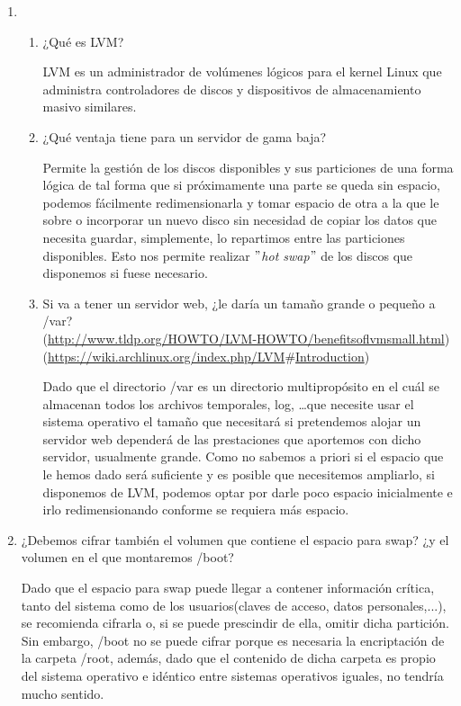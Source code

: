 \documentclass[paper=a4, fontsize=11pt]{scrartcl} %
\numberwithin{equation}{section} %
\numberwithin{figure}{section} %
\numberwithin{table}{section} %
\begin{document}
\begin{enumerate}
		
		\item \begin{enumerate}
			\item ¿Qué es LVM?
			
			LVM es un administrador de volúmenes lógicos para el kernel Linux que administra
			controladores de discos y dispositivos de almacenamiento masivo similares.\cite{LVM}
			
			\item ¿Qué ventaja tiene para un servidor de gama baja?
			
			Permite la gestión de los discos disponibles y sus particiones de una forma lógica de
			tal forma que si próximamente una parte se queda sin espacio, podemos fácilmente
			redimensionarla y tomar espacio de otra a la que le sobre o incorporar un nuevo disco
			sin necesidad de copiar los datos que necesita guardar, simplemente, lo repartimos
			entre las particiones disponibles. Esto nos permite realizar \textit{$"$hot swap$"$}
			de los discos que disponemos si fuese necesario.
			
			\item Si va a tener un servidor web, ¿le daría un tamaño grande o pequeño a /var?\\
			(\href{http://www.tldp.org/HOWTO/LVM-HOWTO/benefitsoflvmsmall.html}
			{http://www.tldp.org/HOWTO/LVM-HOWTO/benefitsoflvmsmall.html})\\
			(\href{https://wiki.archlinux.org/index.php/LVM#Introduction}
			{https://wiki.archlinux.org/index.php/LVM$\#$Introduction})
			
			Dado que el directorio /var es un directorio multipropósito en el cuál se almacenan
			todos los archivos temporales, log, \dots que necesite usar el sistema operativo\cite{Var}
			el tamaño que necesitará si pretendemos alojar un servidor web dependerá de las prestaciones
			que aportemos con dicho servidor, usualmente grande. Como no sabemos a priori si el espacio
			que le hemos dado será suficiente y es posible que necesitemos ampliarlo, si disponemos de
			LVM, podemos optar por darle poco espacio inicialmente e irlo redimensionando conforme se
			requiera más espacio.
			
		\end{enumerate}
		
		\item ¿Debemos cifrar también el volumen que contiene el espacio para swap? ¿y el volumen
		en el que montaremos /boot?
		
		Dado que el espacio para swap puede llegar a contener información crítica, tanto del sistema como
		de los usuarios(claves de acceso, datos personales,...), se recomienda cifrarla o, si se puede 
		prescindir de ella, omitir dicha partición\cite{swap}. Sin embargo, /boot no se puede cifrar porque
		es necesaria la encriptación de la carpeta /root\cite{boot}, además, dado que el contenido de dicha
		carpeta es propio del sistema operativo e idéntico entre sistemas operativos iguales, no tendría mucho
		sentido.
		

\end{enumerate}
\end{document}
